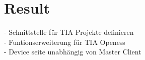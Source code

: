\chapter{Result}
\label{Result}
	- Schnittstelle für TIA Projekte definieren\\
	- Funtionserweiterung für TIA Openess\\
	- Device seite unabhängig von Master Client\\
	
